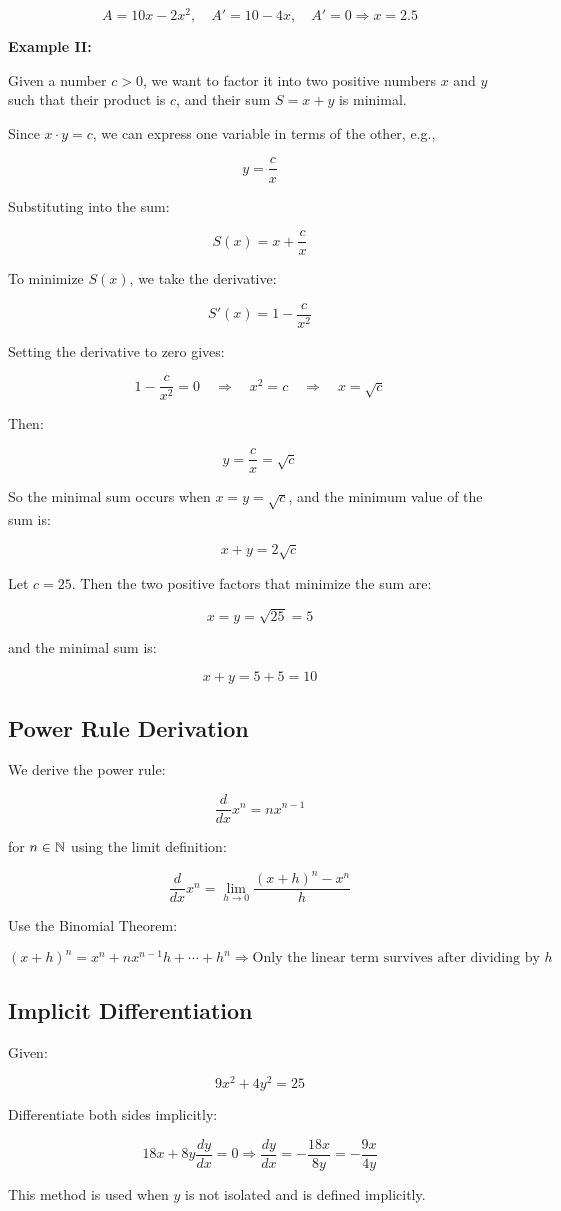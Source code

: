 \[
    A = 10x - 2x^2, \quad A' = 10 - 4x, \quad A' = 0 \Rightarrow x = 2.5
\]

\textbf{Example II:}

Given a number \( c > 0 \), we want to factor it into two positive numbers \( x \) and \( y \) such that 
their product is \( c \), and their sum \( S = x + y \) is minimal.

Since \( x \cdot y = c \), we can express one variable in terms of the other, e.g.,

\[
    y = \frac{c}{x}
\]

Substituting into the sum:

\[
    S(x) = x + \frac{c}{x}
\]

To minimize \( S(x) \), we take the derivative:

\[
    S'(x) = 1 - \frac{c}{x^2}
\]

Setting the derivative to zero gives:

\[
    1 - \frac{c}{x^2} = 0 \quad \Rightarrow \quad x^2 = c \quad \Rightarrow \quad x = \sqrt{c}
\]

Then:

\[
    y = \frac{c}{x} = \sqrt{c}
\]

So the minimal sum occurs when \( x = y = \sqrt{c} \), and the minimum value of the sum is:

\[
x + y = 2\sqrt{c}
\]

Let \( c = 25 \). Then the two positive factors that minimize the sum are:

\[
    x = y = \sqrt{25} = 5
\]

and the minimal sum is:

\[
    x + y = 5 + 5 = 10
\]

\subsection{Power Rule Derivation}

We derive the power rule:

\[
    \frac{d}{dx} x^n = nx^{n - 1}
\]

for \(n \in \mathbb{N}\) using the limit definition:

\[
    \frac{d}{dx} x^n = \lim_{h \to 0} \frac{{(x + h)}^n - x^n}{h}
\]

Use the Binomial Theorem:

\[
    {(x + h)}^n = x^n + nx^{n-1}h + \cdots + h^n
    \Rightarrow \text{Only the linear term survives after dividing by } h
\]

\subsection{Implicit Differentiation}

Given:

\[
    9x^2 + 4y^2 = 25
\]

Differentiate both sides implicitly:

\[
    18x + 8y \frac{dy}{dx} = 0
    \Rightarrow \frac{dy}{dx} = -\frac{18x}{8y} = -\frac{9x}{4y}
\]

This method is used when \(y\) is not isolated and is defined implicitly.
